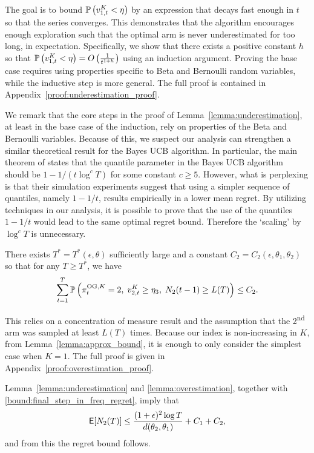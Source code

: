 \begin{myproof}[Proof.]
	\begin{myproof}
		The goal is to bound $\P{v^K_{1,t} < \eta}$ by an expression that decays fast enough in $t$ so that the series converges. 
		This demonstrates that the algorithm encourages enough exploration such that the optimal arm is never underestimated for too long, in expectation.
		Specifically, we show that there exists a positive constant $h$ so that $\P{v^K_{1,t} < \eta} = O\left(\frac{1}{t^{1+h}}\right)$ using an induction argument. Proving the base case requires using properties specific to Beta and Bernoulli random variables, while the inductive step is more general.
		The full proof is contained in Appendix~\ref{proof:underestimation_proof}.
		
		We remark that the core steps in the proof of Lemma~\ref{lemma:underestimation}, at least in the base case of the induction, rely on properties of the Beta and Bernoulli variables. Because of this, we suspect our analysis can strengthen a similar theoretical result for the Bayes UCB algorithm. In particular, the main theorem of \cite{kaufmann2012thompson} states that the quantile parameter in the Bayes UCB algorithm should be $1 - 1/(t \log^c T)$ for some constant $c \ge 5$. However, what is perplexing is that their simulation experiments suggest that using a simpler sequence of quantiles, namely $1 -1/t$, results empirically in a lower mean regret. By utilizing techniques in our analysis, it is possible to prove that the use of the quantiles $1-1/t$ would lead to the same optimal regret bound. Therefore the `scaling' by $\log^c T$ is unnecessary.
	\end{myproof}
	\begin{lemma} \label{lemma:overestimation}
		There exists $T^* = T^*(\epsilon, \theta)$ sufficiently large and a constant $C_2 = C_2(\epsilon, \theta_1, \theta_2)$ so that for any $T \ge T^*$, we have
		\begin{equation*}
		\sum_{t=1}^T \P{\pi^{{\rm OG},K}_t = 2,\; v^K_{2,t} \ge \eta_3, \; N_2(t-1) \ge L(T)} \le C_2.
		\end{equation*}
	\end{lemma}
	\begin{myproof}
		This relies on a concentration of measure result and the assumption that the 2\textsuperscript{nd} arm was sampled at least $L(T)$ times. Because our index is non-increasing in $K$, from Lemma~\ref{lemma:approx_bound}, it is enough to only consider the simplest case when $K = 1$. The full proof is given in Appendix~\ref{proof:overestimation_proof}.
	\end{myproof}
	Lemma~\ref{lemma:underestimation} and \ref{lemma:overestimation}, together with \eqref{bound:final_step_in_freq_regret}, imply that
	\[
	\E[N_2(T)] \le \frac{(1+\epsilon)^2 \log T}{d(\theta_2, \theta_1)} +  C_1 +  C_2,
	\]
	and from this the regret bound follows.
\end{myproof}
